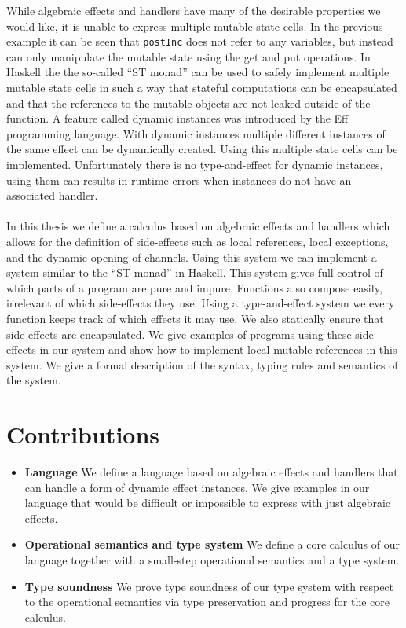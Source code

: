 While algebraic effects and handlers have many of the desirable properties we would like, it is unable to express multiple mutable state cells.
In the previous example it can be seen that \texttt{postInc} does not refer to any variables, but instead can only manipulate the mutable state using the get and put operations.
In Haskell the the so-called ``ST monad''\cite{runst} can be used to safely implement multiple mutable state cells in such a way that stateful computations can be encapsulated and that the references to the mutable objects are not leaked outside of the function. 
A feature called dynamic instances was introduced by the Eff programming language\cite{eff1}.
With dynamic instances multiple different instances of the same effect can be dynamically created.
Using this multiple state cells can be implemented.
Unfortunately there is no type-and-effect for dynamic instances, using them can results in runtime errors when instances do not have an associated handler.
\\\\
In this thesis we define a calculus based on algebraic effects and handlers which allows for the definition of side-effects such as local references, local exceptions, and the dynamic opening of channels.
Using this system we can implement a system similar to the ``ST monad'' in Haskell.
This system gives full control of which parts of a program are pure and impure.
Functions also compose easily, irrelevant of which side-effects they use.
Using a type-and-effect system we every function keeps track of which effects it may use.
We also statically ensure that side-effects are encapsulated.
We give examples of programs using these side-effects in our system and show how to implement local mutable references in this system.
We give a formal description of the syntax, typing rules and semantics of the system.

\section*{Contributions}
\begin{itemize}

\item \textbf{Language}
We define a language based on algebraic effects and handlers that can handle a form of dynamic effect instances.
We give examples in our language that would be difficult or impossible to express with just algebraic effects.

\item \textbf{Operational semantics and type system}
We define a core calculus of our language together with a small-step operational semantics and a type system.

\item \textbf{Type soundness}
We prove type soundness of our type system with respect to the operational semantics via type preservation and progress for the core calculus.

\end{itemize}

